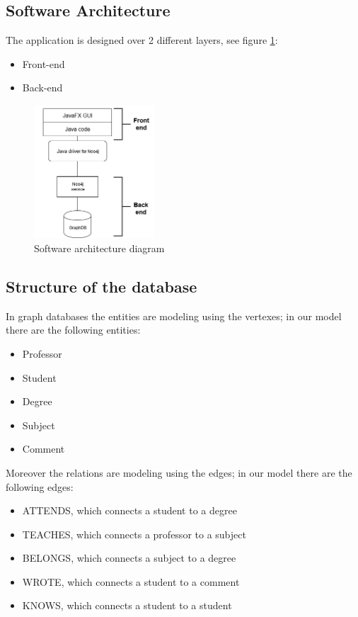 \documentclass[a4paper]{article}
\begin{document}
\subsection{Software Architecture}
The application is designed over 2 different layers, see figure \ref{fig:architecture_diagram}:
\begin{itemize}
\item Front-end
\item Back-end
\end{itemize}
\begin{figure}[h]
\centering
\includegraphics[width=0.4\textwidth]{./images/diagrams/architecture_diagram.png} 
\caption{Software architecture diagram\\}
\label{fig:architecture_diagram}
\end{figure}

\subsection{Structure of the database}
In graph databases the entities are modeling using the vertexes; in our model there are the following entities:
\begin{itemize}
\item Professor
\item Student
\item Degree
\item Subject
\item Comment
\end{itemize}
Moreover the relations are modeling using the edges; in our model there are the following edges:
\begin{itemize}
\item ATTENDS, which connects a student to a degree
\item TEACHES, which connects a professor to a subject
\item BELONGS, which connects a subject to a degree
\item WROTE, which connects a student to a comment
\item KNOWS, which connects a student to a student
\end{itemize}
\end{document}
